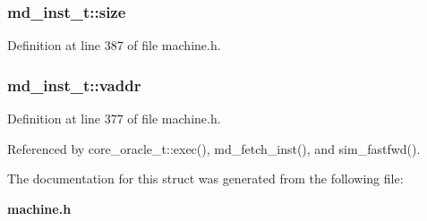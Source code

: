 \subsubsection[{size}]{ {\bf md\_\-inst\_\-t::size}}\label{structmd__inst__t_4d7ae58227f8de4777efb8d5e5e9ff17}




Definition at line 387 of file machine.h.
\subsubsection[{vaddr}]{ {\bf md\_\-inst\_\-t::vaddr}}\label{structmd__inst__t_95beb627225d1c1eb84837df86c53e28}




Definition at line 377 of file machine.h.

Referenced by core\_\-oracle\_\-t::exec(), md\_\-fetch\_\-inst(), and sim\_\-fastfwd().

The documentation for this struct was generated from the following file:\begin{CompactItemize}
\item 
{\bf machine.h}\end{CompactItemize}
